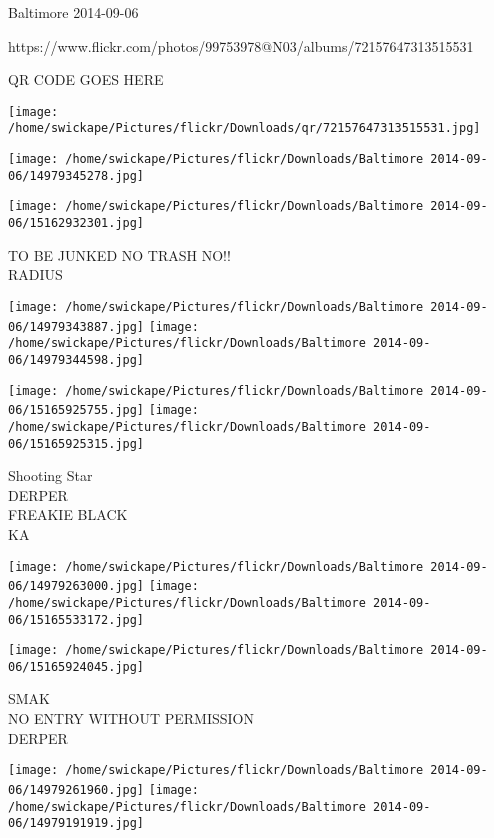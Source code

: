 \documentclass[10pt,letterpaper]{article}
\begin{document}
Baltimore 2014-09-06

https://www.flickr.com/photos/99753978@N03/albums/72157647313515531

QR CODE GOES HERE

\texttt{[image: /home/swickape/Pictures/flickr/Downloads/qr/72157647313515531.jpg]}
\pagebreak

\texttt{[image: /home/swickape/Pictures/flickr/Downloads/Baltimore 2014-09-06/14979345278.jpg]}

\vspace{0.25in}
\texttt{[image: /home/swickape/Pictures/flickr/Downloads/Baltimore 2014-09-06/15162932301.jpg]}

TO BE JUNKED NO TRASH NO!!\\
RADIUS\\
\pagebreak

\texttt{[image: /home/swickape/Pictures/flickr/Downloads/Baltimore 2014-09-06/14979343887.jpg]}
\texttt{[image: /home/swickape/Pictures/flickr/Downloads/Baltimore 2014-09-06/14979344598.jpg]}

\texttt{[image: /home/swickape/Pictures/flickr/Downloads/Baltimore 2014-09-06/15165925755.jpg]}
\texttt{[image: /home/swickape/Pictures/flickr/Downloads/Baltimore 2014-09-06/15165925315.jpg]}

Shooting Star\\
DERPER\\
FREAKIE BLACK\\
KA\\
\pagebreak

\texttt{[image: /home/swickape/Pictures/flickr/Downloads/Baltimore 2014-09-06/14979263000.jpg]}
\texttt{[image: /home/swickape/Pictures/flickr/Downloads/Baltimore 2014-09-06/15165533172.jpg]}

\vspace{0.25in}
\texttt{[image: /home/swickape/Pictures/flickr/Downloads/Baltimore 2014-09-06/15165924045.jpg]}

SMAK\\
NO ENTRY WITHOUT PERMISSION\\
DERPER\\
\pagebreak

\texttt{[image: /home/swickape/Pictures/flickr/Downloads/Baltimore 2014-09-06/14979261960.jpg]}
\texttt{[image: /home/swickape/Pictures/flickr/Downloads/Baltimore 2014-09-06/14979191919.jpg]}
\end{document}

